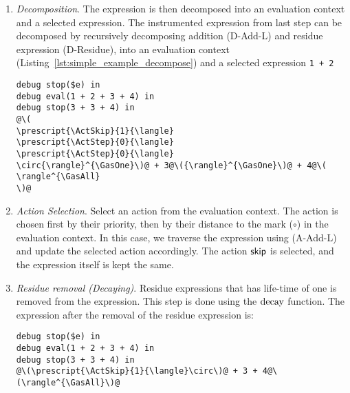 \begin{enumerate}
  Generally, we want to remove all immediately adjacent residue
  expressions by picking the one with higest priority, because this is
  the only one that can be picked among these residue expressions
  during the action selection process. Here, the most outward two
  residue expressions are adjacent:
  \(\Residue{\ActStep}{\GasOne}{0}{\Residue{\ActSkip}{\GasAll}{1}{\ldots}}\),
  we remove the ones with lower priorities (O-Residue-Inner) to get
  \(\Residue{\ActSkip}{\GasAll}{1}{\ldots}\).

\begin{lstlisting}[
  language=hazel,
  caption={Program after instrumentation, optimized},
]
debug stop($e) in
debug eval(1 + 2 + 3 + 4) in
debug stop(3 + 3 + 4) in
@\(
\prescript{\ActSkip}{1}{\langle}
\prescript{\ActStep}{0}{\langle}
\prescript{\ActStep}{0}{\langle}
\)@1 + 2@\({\rangle}^{\GasOne}\)@ + 3@\({\rangle}^{\GasOne}\)@ + 4@\(
\rangle^{\GasAll}
\)@\end{lstlisting}

\item \emph{Decomposition}. \label{num:simple_example_decompose} The
  expression is then decomposed into an evaluation context and a
  selected expression. The instrumented expression from last step can
  be decomposed by recursively decomposing addition (D-Add-L) and
  residue expression (D-Residue), into an evaluation context
  (Listing~\ref{lst:simple_example_decompose}) and a selected
  expression \lstinline{1 + 2}

  \begin{lstlisting}[language=hazel,caption={Decomposed evaluation context},label={lst:simple_example_decompose}]
debug stop($e) in
debug eval(1 + 2 + 3 + 4) in
debug stop(3 + 3 + 4) in
@\(
\prescript{\ActSkip}{1}{\langle}
\prescript{\ActStep}{0}{\langle}
\prescript{\ActStep}{0}{\langle}
\circ{\rangle}^{\GasOne}\)@ + 3@\({\rangle}^{\GasOne}\)@ + 4@\(
\rangle^{\GasAll}
\)@\end{lstlisting}

\item \emph{Action Selection}. \label{num:simple_example_select}
  Select an action from the evaluation context. The action is chosen
  first by their priority, then by their distance to the mark
  (\(\circ\)) in the evaluation context. In this case, we traverse
  the expression using (A-Add-L) and update the selected action
  accordingly. The action \(\mathsf{skip}\) is selected, and the expression
  itself is kept the same.

\item \emph{Residue removal (Decaying)}. Residue expressions that
  has life-time of one is removed from the expression. This step is
  done using the \(\operatorname{decay}\) function. The expression after the removal
  of the residue expression is:
  \begin{lstlisting}[language=hazel,caption={Evaluation context after decaying},label={lst:simple_example_decay}]
debug stop($e) in
debug eval(1 + 2 + 3 + 4) in
debug stop(3 + 3 + 4) in
@\(\prescript{\ActSkip}{1}{\langle}\circ\)@ + 3 + 4@\(\rangle^{\GasAll}\)@\end{lstlisting}


\end{enumerate}
